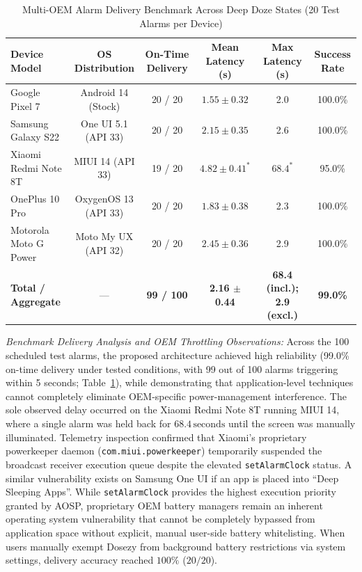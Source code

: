 \documentclass[11pt,a4paper]{article}
\begin{document}
\begin{table}[htbp]
\centering
\small
\caption{Multi-OEM Alarm Delivery Benchmark Across Deep Doze States (20 Test Alarms per Device)}
\label{tab:oem_benchmark}
\begin{tabular}{lccccc}
\toprule
\textbf{Device Model} & \textbf{OS Distribution} & \textbf{On-Time Delivery} & \textbf{Mean Latency (s)} & \textbf{Max Latency (s)} & \textbf{Success Rate} \\
\midrule
Google Pixel 7 & Android 14 (Stock) & 20 / 20 & $1.55 \pm 0.32$ & 2.0 & 100.0\% \\
Samsung Galaxy S22 & One UI 5.1 (API 33) & 20 / 20 & $2.15 \pm 0.35$ & 2.6 & 100.0\% \\
Xiaomi Redmi Note 8T & MIUI 14 (API 33) & 19 / 20 & $4.82 \pm 0.41^*$ & $68.4^*$ & 95.0\% \\
OnePlus 10 Pro & OxygenOS 13 (API 33) & 20 / 20 & $1.83 \pm 0.38$ & 2.3 & 100.0\% \\
Motorola Moto G Power & Moto My UX (API 32) & 20 / 20 & $2.45 \pm 0.36$ & 2.9 & 100.0\% \\
\midrule
\textbf{Total / Aggregate} & --- & \textbf{99 / 100} & \textbf{2.16 $\pm$ 0.44} & \textbf{68.4 (incl.); 2.9 (excl.)} & \textbf{99.0\%} \\
\bottomrule
\end{tabular}
\end{table}

\emph{Benchmark Delivery Analysis and OEM Throttling Observations:} Across the 100 scheduled test alarms, the proposed architecture achieved high reliability (99.0\% on-time delivery under tested conditions, with 99 out of 100 alarms triggering within 5 seconds; Table~\ref{tab:oem_benchmark}), while demonstrating that application-level techniques cannot completely eliminate OEM-specific power-management interference. The sole observed delay occurred on the Xiaomi Redmi Note 8T running MIUI 14, where a single alarm was held back for $68.4\,\text{seconds}$ until the screen was manually illuminated. Telemetry inspection confirmed that Xiaomi's proprietary powerkeeper daemon (\texttt{com.miui.powerkeeper}) temporarily suspended the broadcast receiver execution queue despite the elevated \texttt{setAlarmClock} status. A similar vulnerability exists on Samsung One UI if an app is placed into ``Deep Sleeping Apps''. While \texttt{setAlarmClock} provides the highest execution priority granted by AOSP, proprietary OEM battery managers remain an inherent operating system vulnerability that cannot be completely bypassed from application space without explicit, manual user-side battery whitelisting. When users manually exempt Dosezy from background battery restrictions via system settings, delivery accuracy reached $100\%$ ($20/20$).
\end{document}
